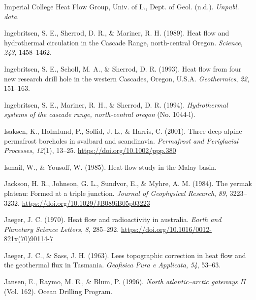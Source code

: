 \begin{CSLReferences}{1}{1}
\leavevmode{}%
Imperial College Heat Flow Group, Univ. of L., Dept. of Geol. (n.d.). \emph{Unpubl. data}.

\leavevmode{}%
Ingebritsen, S. E., Sherrod, D. R., \& Mariner, R. H. (1989). Heat flow and hydrothermal circulation in the {Cascade Range, north-central Oregon}. \emph{Science}, \emph{243}, 1458--1462.

\leavevmode{}%
Ingebritsen, S. E., Scholl, M. A., \& Sherrod, D. R. (1993). Heat flow from four new research drill hole in the western {Cascades, Oregon, U.S.A.} \emph{Geothermics}, \emph{22}, 151--163.

\leavevmode{}%
Ingebritsen, S. E., Mariner, R. H., \& Sherrod, D. R. (1994). \emph{Hydrothermal systems of the cascade range, north-central oregon} (No. 1044-l).

\leavevmode{}%
Isaksen, K., Holmlund, P., Sollid, J. L., \& Harris, C. (2001). Three deep alpine-permafrost boreholes in svalbard and scandinavia. \emph{Permafrost and Periglacial Processes}, \emph{12}(1), 13--25. \url{https://doi.org/10.1002/ppp.380}

\leavevmode{}%
Ismail, W., \& Yousoff, W. (1985). Heat flow study in the {Malay basin}.

\leavevmode{}%
Jackson, H. R., Johnson, G. L., Sundvor, E., \& Myhre, A. M. (1984). The yermak plateau: Formed at a triple junction. \emph{Journal of Geophysical Research}, \emph{89}, 3223--3232. \url{https://doi.org/10.1029/JB089iB05p03223}

\leavevmode{}%
Jaeger, J. C. (1970). Heat flow and radioactivity in australia. \emph{Earth and Planetary Science Letters}, \emph{8}, 285--292. \url{https://doi.org/10.1016/0012-821x(70)90114-7}

\leavevmode{}%
Jaeger, J. C., \& Sass, J. H. (1963). Lees topographic correction in heat flow and the geothermal flux in {Tasmania}. \emph{Geofisica Pura e Applicata}, \emph{54}, 53--63.

\leavevmode{}%
Jansen, E., Raymo, M. E., \& Blum, P. (1996). \emph{North atlantic--arctic gateways II} (Vol. 162). Ocean Drilling Program.


\end{CSLReferences}
